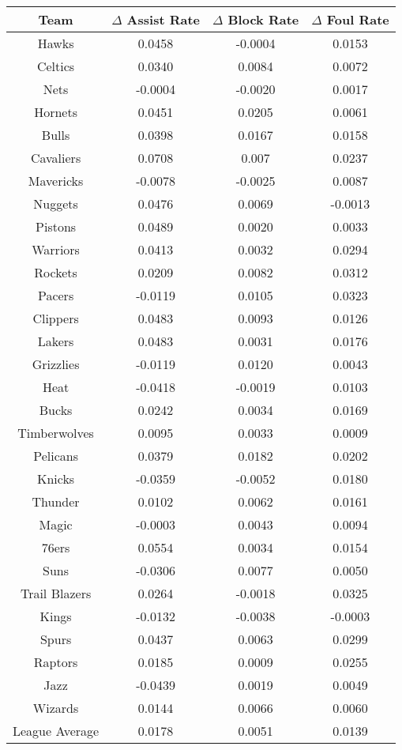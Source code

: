 \documentclass{article}
\begin{document}
\begin{center}
\begin{tabular}{ ||c|c|c|c|| }
\hline
 Team & $\Delta$ Assist Rate & $\Delta$ Block Rate & $\Delta$ Foul Rate\\ [0.5ex] 
 \hline\hline
 Hawks & 0.0458 & -0.0004 & 0.0153
\\
Celtics & 0.0340 & 0.0084 & 0.0072  
\\
Nets & -0.0004 & -0.0020 & 0.0017  
\\
Hornets & 0.0451 & 0.0205 & 0.0061  
\\
Bulls & 0.0398 & 0.0167 & 0.0158  
\\
Cavaliers &  0.0708 & 0.007 & 0.0237  
\\
Mavericks & -0.0078 & -0.0025 & 0.0087 
\\
Nuggets & 0.0476 & 0.0069 & -0.0013
\\
Pistons & 0.0489 & 0.0020 & 0.0033  
\\
Warriors & 0.0413 & 0.0032 & 0.0294  
\\
Rockets & 0.0209 & 0.0082 & 0.0312  
\\
Pacers & -0.0119 & 0.0105 & 0.0323  
\\
Clippers  &  0.0483 & 0.0093 & 0.0126  
\\
Lakers & 0.0483 & 0.0031 & 0.0176  
\\
Grizzlies & -0.0119 & 0.0120 & 0.0043  
\\
Heat & -0.0418 & -0.0019 & 0.0103  
\\
Bucks & 0.0242 & 0.0034 & 0.0169  
\\ 
Timberwolves & 0.0095 & 0.0033 & 0.0009  
\\
Pelicans & 0.0379 & 0.0182 & 0.0202  
\\
Knicks & -0.0359 & -0.0052 & 0.0180  
 \\
Thunder & 0.0102 & 0.0062 & 0.0161  
\\
Magic & -0.0003 & 0.0043 & 0.0094  
\\
76ers & 0.0554 & 0.0034 & 0.0154  
\\
Suns & -0.0306 & 0.0077 & 0.0050  
\\
Trail Blazers & 0.0264 & -0.0018 & 0.0325
\\
Kings &  -0.0132 &  -0.0038 & -0.0003
\\
Spurs & 0.0437 & 0.0063 & 0.0299  
\\
Raptors & 0.0185 &  0.0009 & 0.0255  
\\
Jazz & -0.0439 & 0.0019 & 0.0049  
\\
Wizards & 0.0144 & 0.0066 & 0.0060
\\
 \hline
 League Average & 0.0178 & 0.0051 & 0.0139
 \\
 \hline
\end{tabular}
\label{tableteams}
\end{center}
\end{document}
